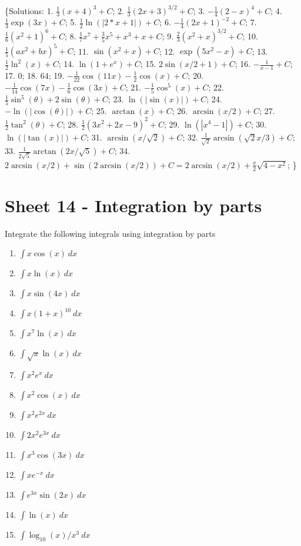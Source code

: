 \documentclass[
  11pt,
  oneside]{book}
\providecommand{\tightlist}{%
  \setlength{\itemsep}{0pt}\setlength{\parskip}{0pt}}
\newcommand{\slide}{}
\theoremstyle{definition}
\theoremstyle{definition}
\theoremstyle{definition}
\theoremstyle{definition}
\theoremstyle{remark}
\begin{document}
\{Solutions:
1. \(\frac{1}{3}(x+4)^3+C\);
2. \(\frac{1}{3}(2x+3)^{3/2}+C\);
3. \(-\frac{1}{4}(2-x)^4 +C\);
4. \(\frac{1}{3}\exp(3x)+C\);
5. \(\frac{1}{2}\ln(|2*x+1|)+C\);
6. \(-\frac{1}{4}(2x+1)^{-2}+C\);
7. \(\frac{1}{6}(x^2+1)^6+C\);
8. \(\frac{1}{7}x^7+\frac{3}{5}x^5+x^3+x+C\);
9. \(\frac{2}{3}(x^2+x)^{3/2}+C\);
10. \(\frac{1}{5}(ax^2+bx)^{5}+C\);
11. \(\sin(x^2+x)+C\);
12. \(\exp(5x^2-x)+C\);
13. \(\frac{1}{2}\ln^2(x)+C\);
14. \(\ln(1+e^x)+C\);
15. \(2\sin(x/2+1)+C\);
16. \(-\frac{1}{x-1}+C\);
17. \(0\);
18. \(64\);
19. \(-\frac{1}{22}\cos(11x)-\frac{1}{2}\cos(x)+C\);
20. \(-\frac{1}{14}\cos(7x)-\frac{1}{6}\cos(3x)+C\);
21. \(-\frac{1}{5}\cos^5(x)+C\);
22. \(\frac{1}{5}\sin^5(\theta)+2\sin(\theta)+C\);
23. \(\ln(|\sin(x)|)+C\);
24. \(-\ln(|\cos(\theta)|)+C\);
25. \(\arctan(x)+C\);
26. \(\arcsin(x/2)+C\);
27. \(\frac{1}{2}\tan^2(\theta)+C\);
28. \(\frac{1}{2}(3x^2+2x-9)^2+C\);
29. \(\ln(|x^4-1|)+C\);
30. \(\ln(|\tan(x)|)+C\);
31. \(\arcsin(x/\sqrt{2})+C\);
32. \(\frac{1}{\sqrt{2}}\arcsin(\sqrt{2}x/3) +C\);
33. \(\frac{1}{2\sqrt{5}}\arctan(2x/\sqrt{5}) +C\);
34. \(2\arcsin(x/2) + \sin\left(2\arcsin(x/2)\right) +C = 2\arcsin(x/2)+\frac{x}{2}\sqrt{4-x^2}\);
\}

\slide

\section{Sheet 14 - Integration by parts}\label{sheet-14---integration-by-parts}

Integrate the following integrals using integration by parts

\begin{enumerate}
\def\labelenumi{\arabic{enumi}.}
\tightlist
\item
  \(\int x\cos(x)\ dx\)
\item
  \(\int x\ln(x)\ dx\)
\item
  \(\int x\sin(4x)\ dx\)
\item
  \(\int x(1+x)^{10}\ dx\)
\item
  \(\int x^7\ln(x)\ dx\)
\item
  \(\int \sqrt{x}\ln(x)\ dx\)
\item
  \(\int x^2e^x\ dx\)
\item
  \(\int x^2\cos(x)\ dx\)
\item
  \(\int x^2e^{2x}\ dx\)
\item
  \(\int 2x^2e^{3x}\ dx\)
\item
  \(\int x^3\cos(3x)\ dx\)
\item
  \(\int xe^{-x}\ dx\)
\item
  \(\int e^{3x}\sin(2x)\ dx\)
\item
  \(\int \ln(x)\ dx\)
\item
  \(\int \log_{10}(x)/x^3\ dx\)
\end{enumerate}
\end{document}
